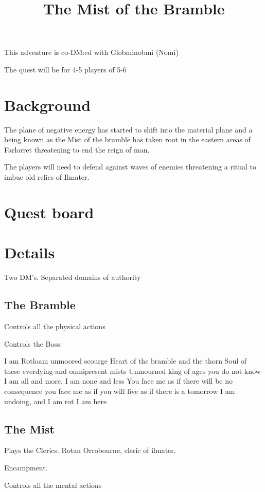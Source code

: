 \documentclass{article}
\title{The Mist of the Bramble}
\begin{document}
    This adventure is co-DM:ed with Globminobmi (Nomi)

    The quest will be for 4-5 players of 5-6 

    \section{Background}

    The plane of negative energy has started to shift into the material plane and a being known as the Mist of the bramble has taken root in the eastern areas of Farlorret threatening to end the reign of man.

    The players will need to defend against waves of enemies threatening a ritual to imbue old relics of Ilmater. 

    \section{Quest board}


    \section{Details}

    Two DM's. Separated domains of authority

    \subsection*{The Bramble}

    Controls all the physical actions

    Controls the Boss:

        I am Rotloam
        unmoored scourge
        Heart of the bramble and the thorn 
        Soul of these everdying and omnipresent mists 
        Unmourned king of ages you do not know
        I am all and more. 
        I am none and less
        You face me as if there will be no consequence
        you face me as if you will live
        as if there is a tomorrow
        I am undoing, and I am rot 
        I am here 

    \subsection*{The Mist}

    Plays the Clerics. Rotan Orrobourne, cleric of ilmater. 

    Encampment. 

    Controls all the mental actions
\end{document}
